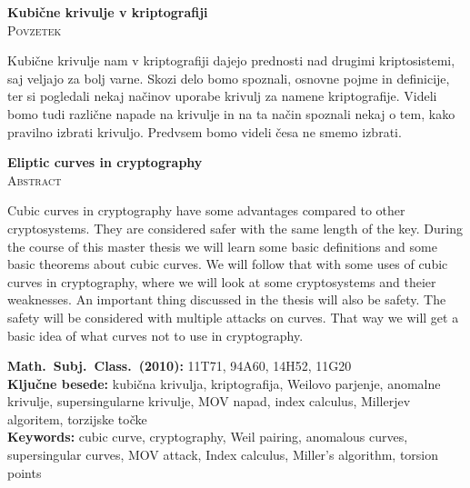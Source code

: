 \documentclass[12pt,a4paper,twoside]{article}
\newcommand{\naslovdela}{Kubične krivulje v kriptografiji}
\newcommand{\kljucnebesede}{kubična krivulja\sep kriptografija\sep Weilovo parjenje\sep anomalne krivulje\sep supersingularne krivulje\sep MOV napad\sep index calculus\sep Millerjev algoritem\sep torzijske točke} %
\newcommand{\keywords}{cubic curve\sep cryptography\sep Weil pairing\sep anomalous curves\sep supersingular curves\sep MOV attack\sep Index calculus\sep Miller's algorithm\sep torsion points} %
\newcommand{\sep}{, }  %
\theoremstyle{definition} %
\theoremstyle{plain} %
\numberwithin{equation}{section}  %
\begin{document}

\cleardoublepage
{}

\begin{center}
\textbf{\naslovdela} \\[3mm]
\textsc{Povzetek} \\[2mm]
\end{center}
Kubične krivulje nam v kriptografiji dajejo prednosti nad drugimi kriptosistemi, saj veljajo za bolj varne. Skozi delo bomo spoznali, osnovne pojme in definicije, ter si pogledali nekaj načinov uporabe krivulj za namene kriptografije. Videli bomo tudi različne napade na krivulje in na ta način spoznali nekaj o tem, kako pravilno izbrati krivuljo. Predvsem bomo videli česa ne smemo izbrati.

\vfill
\begin{center}
\textbf{Eliptic curves in cryptography} \\[3mm] %
\textsc{Abstract}\\[2mm]
\end{center}

Cubic curves in cryptography have some advantages compared to other cryptosystems. They are considered safer with the same length of the key. During the course of this master thesis we will learn some basic definitions and some basic theorems about cubic curves. We will follow that with some uses of cubic curves in cryptography, where we will look at some cryptosystems and theier weaknesses. An important thing discussed in the thesis will also be safety. The safety will be considered with multiple attacks on curves. That way we will get a basic idea of what curves not to use in cryptography. 

\vfill\noindent
\textbf{Math.~Subj.~Class.~(2010):}	11T71, 94A60, 14H52, 11G20  \\[1mm]
\textbf{Ključne besede:} \kljucnebesede \\[1mm]
\textbf{Keywords:} \keywords

\cleardoublepage

\setcounter{page}{1}    %



\end{document}
